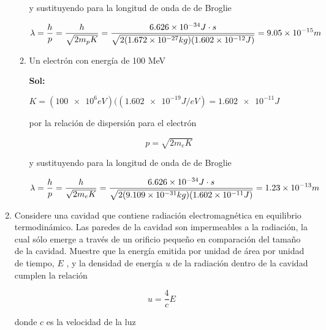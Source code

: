 \documentclass[12pt,a4paper]{article}
\begin{document}
\begin{enumerate}
\begin{enumerate}
        y sustituyendo para la longitud de onda de de Broglie
        
        \begin{equation*}
            \lambda = \frac{h}{p} = \frac{h}{\sqrt{2 m_p K}} = \frac{\num{6.626 e -34}J\cdot s}{\sqrt{2(\num{1.672e-27}kg)(\num{1.602 e-12} J)}} = \num{9.05e-15}m
        \end{equation*}
        
        
        
        
        \item Un electrón con energía de 100 MeV
        
        \textbf{Sol:}
        
        $K = (\num{100e6} eV)((\num{1.602 e-19} J/eV)=\num{1.602 e-11} J$
        
         por la relación de dispersión para el electrón 
        
        \begin{equation*}
            p= \sqrt{2 m_e K}
        \end{equation*}
        
        y sustituyendo para la longitud de onda de de Broglie
        
        \begin{equation*}
            \lambda = \frac{h}{p} = \frac{h}{\sqrt{2 m_e K}} = \frac{\num{6.626 e -34}J\cdot s}{\sqrt{2(\num{9.109 e-31}kg)(\num{1.602 e-11} J)}} = \num{1.23e-13}m
        \end{equation*}
        
        
    \end{enumerate}
    
    
    
    
    
    \item Considere una cavidad que contiene radiación electromagnética en equilibrio termodinámico. Las paredes de la cavidad son impermeables a la radiación, la cual sólo emerge a través de un orificio pequeño en comparación del tamaño de la cavidad. Muestre que la energía emitida por unidad de área por unidad de tiempo, $E$ , y la densidad de energía $u$ de la radiación dentro de la cavidad cumplen la relación
    
    \begin{equation*}
        u = \frac{4}{c} E
    \end{equation*}
    
    donde $c$ es la velocidad de la luz
    

\end{enumerate}
\end{document}
